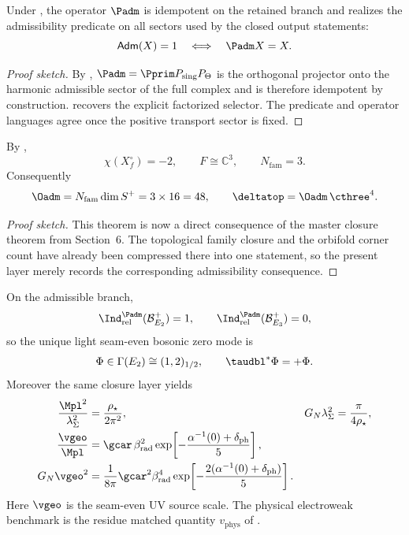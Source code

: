 \begin{theorem}
Under , the
operator $\Padm$ is idempotent on the retained branch and realizes the admissibility predicate
on all sectors used by the closed output statements:
\[
\mathsf{Adm}(X)=1
\quad\Longleftrightarrow\quad
\Padm X = X.
\]
\end{theorem}

\begin{proof}[Proof sketch]
By , $\Padm=\Pprim P_{\mathrm{sing}}P_\Theta$ is the orthogonal projector
onto the harmonic admissible sector of the full complex and is therefore idempotent by
construction.  recovers the explicit factorized
selector. The predicate and operator languages agree once the positive transport sector is fixed.
\end{proof}

\begin{theorem}
By ,
\[
\chi(X_f^\circ)=-2,
\qquad
F\cong\mathbb C^3,
\qquad
N_{\mathrm{fam}}=3.
\]
Consequently
\[
\Oadm=N_{\mathrm{fam}}\dim S^+=3\times 16=48,
\qquad
\deltatop=\Oadm\,\cthree^4.
\]
\end{theorem}

\begin{proof}[Proof sketch]
This theorem is now a direct consequence of the master closure theorem from Section~6. The
topological family closure and the orbifold corner count have already been compressed there
into one statement, so the present layer merely records the corresponding admissibility
consequence.
\end{proof}

\begin{theorem}
On the admissible branch,
\[
\Ind_{\mathrm{rel}}^{\Padm}(\mathcal B_{E_2}^+)=1,
\qquad
\Ind_{\mathrm{rel}}^{\Padm}(\mathcal B_{E_3}^+)=0,
\]
so the unique light seam-even bosonic zero mode is
\[
\Phi\in\Gamma(E_2)\cong(1,2)_{1/2},
\qquad
\taudbl^{\ast}\Phi=+\Phi.
\]
Moreover the same closure layer yields
\[
\begin{aligned}
\frac{\Mpl^2}{\lambda_\Sigma^2}&=\frac{\rho_\star}{2\pi^2},
&
G_N\lambda_\Sigma^2&=\frac{\pi}{4\rho_\star},
\\
\frac{\vgeo}{\Mpl}&=\gcar\,\beta_{\mathrm{rad}}^2
\exp\!\left[-\frac{\alpha^{-1}(0)+\delta_{\mathrm{ph}}}{5}\right],
\\
G_N\vgeo^2&=\frac{1}{8\pi}\gcar^2\beta_{\mathrm{rad}}^4
\exp\!\left[-\frac{2(\alpha^{-1}(0)+\delta_{\mathrm{ph}})}{5}\right].
\end{aligned}
\]
Here $\vgeo$ is the seam-even UV source scale. The physical electroweak benchmark is the residue
matched quantity $v_{\mathrm{phys}}$ of .
\end{theorem}

